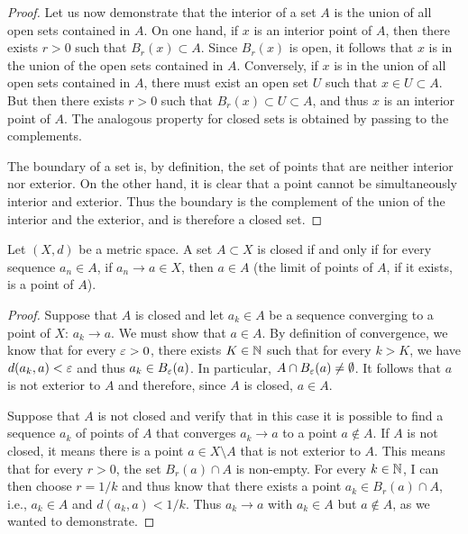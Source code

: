 \begin{proof}
Let us now demonstrate that the interior of a set $A$ is the union of all open
sets contained in $A$. On one hand, if $x$ is an interior point of $A$, then
there exists $r>0$ such that $B_r(x)\subset A$. Since $B_r(x)$ is open, it
follows that $x$ is in the union of the open sets contained in $A$. Conversely,
if $x$ is in the union of all open sets contained in $A$, there must exist an
open set $U$ such that $x\in U \subset A$. But then there exists $r>0$ such that
$B_r(x) \subset U \subset A$, and thus $x$ is an interior point of $A$. The
analogous property for closed sets is obtained by passing to the complements.

The boundary of a set is, by definition, the set of points that are neither
interior nor exterior. On the other hand, it is clear that a point cannot be
simultaneously interior and exterior. Thus the boundary is the complement of the
union of the interior and the exterior, and is therefore a closed set.
\end{proof}

\begin{theorem}%
  \label{th:chiuso_sequenziale}%
Let $(X,d)$ be a metric space.
A set $A\subset X$ is closed if and only if
for every sequence $a_n\in A$, if $a_n\to a\in X$, then $a \in A$
(the limit of points of $A$, if it exists, is a point of $A$).
\end{theorem}
%
\begin{proof}
Suppose that $A$ is closed and let
$a_k \in A$ be a sequence converging to a point of $X$: $a_k \to a$.
We must show that $a\in A$.
By definition of convergence,
we know that for every $\varepsilon>0$, there exists $K\in {\mathbb N}$ such that for every $k>
K$,
we have $d(a_k,a)<\varepsilon$ and thus $a_k \in B_\varepsilon(a)$.
In particular, $A \cap B_\varepsilon(a) \neq \emptyset$.
It follows that $a$ is not exterior to $A$ and therefore, since $A$ is closed,
$a\in A$.

Suppose that $A$ is not closed and verify that in this case
it is possible to find a sequence $a_k$ of points of $A$ that converges $a_k\to
a$
to a point $a\not\in A$.
If $A$ is not closed, it means there is a point $a \in X\setminus A$ that is not
exterior to $A$.
This means that for every $r>0$, the set $B_r(a)\cap A$ is non-empty. For every
$k\in {\mathbb N}$, I can then
choose $r=1/k$ and thus know that there exists a point $a_k\in B_r(a) \cap A$,
i.e., $a_k \in A$ and
$d(a_k,a) < 1/k$.
Thus $a_k \to a$ with $a_k\in A$ but $a\not \in A$, as we wanted to demonstrate.
\end{proof}

